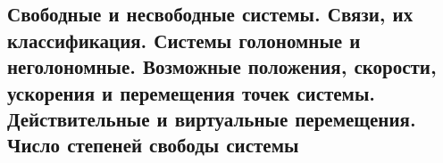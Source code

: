 

\subsection{Свободные и несвободные системы. Связи, их классификация. Системы голономные и неголономные. Возможные положения, скорости, ускорения и перемещения точек системы. Действительные и виртуальные перемещения. Число степеней свободы системы}



